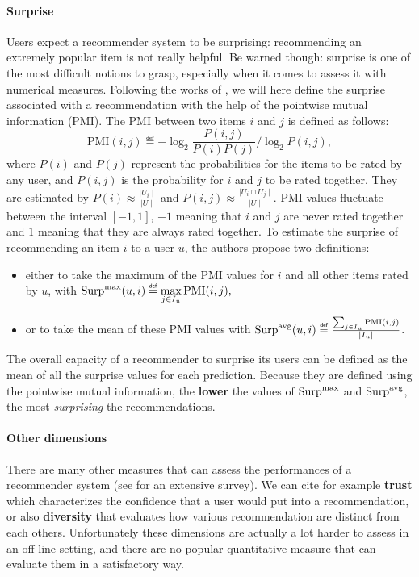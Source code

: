 \paragraph{Surprise\\}
Users expect a recommender system to be surprising: recommending an extremely
popular item is not really helpful. Be warned though: surprise is one of the
most difficult notions to grasp, especially when it comes to assess it with
numerical measures. Following the works of \cite{KamBriRecSys2014}, we will
here define the surprise associated with a recommendation with the
help of the pointwise mutual information (PMI). The PMI between two items $i$
and $j$ is defined as follows:
$$\text{PMI}(i, j) \eqdef -\log_2 \frac{P(i, j)}{P(i)P(j)} / \log_2 P(i, j),$$
where $P(i)$ and $P(j)$  represent the probabilities for the items to be rated
by any user, and $P(i, j)$ is the probability for $i$ and $j$ to be rated
together. They are estimated by $P(i) \approx \frac{\mid U_i \mid}{\mid U
\mid}$ and $P(i, j) \approx \frac{\mid U_i \cap U_j \mid}{\mid U\mid}$. PMI
values fluctuate between the interval $[-1, 1]$, $-1$ meaning that $i$ and $j$
are never rated together and $1$ meaning that they are always rated together.
To estimate the surprise of recommending an item $i$ to a user $u$, the authors
propose two definitions:
\begin{itemize}
\item either to take the maximum of the PMI values for $i$ and all other items
  rated by $u$, with $\surpmax(u, i) \eqdef \max\limits_{j\in I_u}
    \text{PMI}(i, j),$
\item
 or to take the mean of these PMI values with $\surpavg(u, i) \eqdef
    \frac{\sum_{j \in I_u} \text{PMI}(i, j)}{\mid I_u\mid }$.
\end{itemize}

The overall capacity of a recommender to surprise its users can be defined as
the mean of all the surprise values for each prediction. Because they are
defined using the pointwise mutual information, the \textbf{lower} the values
of $\text{Surp}^{\text{max}}$ and $\text{Surp}^{\text{avg}}$, the most \textit{surprising} the recommendations.


\paragraph{Other dimensions\\}

There are  many other measures that can assess the performances of a
recommender system (see \cite{ShaGun11} for an extensive survey). We can cite
for example \textbf{trust} which characterizes the confidence that a user would
put into a recommendation, or also \textbf{diversity} that evaluates how
various recommendation are distinct from each others.  Unfortunately these
dimensions are actually a lot harder to assess in an off-line setting, and
there are no popular quantitative measure that can evaluate them in a
satisfactory way.


